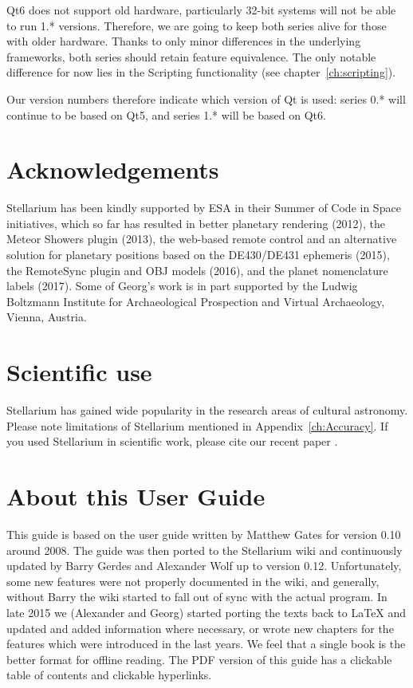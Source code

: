 Qt6 does not support old hardware, particularly 32-bit systems will
not be able to run 1.* versions.  Therefore, we are going to keep both
series alive for those with older hardware. Thanks to only minor
differences in the underlying frameworks, both series should retain
feature equivalence. The only notable difference for now lies in the
Scripting functionality (see chapter~\ref{ch:scripting}).

Our version numbers therefore indicate which version of Qt is used:
series 0.* will continue to be based on Qt5, and series 1.* will be
based on Qt6.

\section{Acknowledgements}
Stellarium has been kindly supported by ESA in their Summer of Code in
Space initiatives, which so far has resulted in better planetary rendering
(2012), the Meteor Showers plugin (2013), the web-based remote
control and an alternative solution for planetary positions based on
the DE430/DE431 ephemeris (2015), the RemoteSync plugin and OBJ models (2016), 
and the planet nomenclature labels (2017). Some of Georg's work is
in part supported by the Ludwig Boltzmann Institute for Archaeological
Prospection and Virtual Archaeology, Vienna, Austria.

\section{Scientific use}

Stellarium has gained wide popularity in the research areas of
cultural astronomy. Please note limitations of Stellarium mentioned in
Appendix~\ref{ch:Accuracy}. If you used Stellarium in scientific work,
please cite our recent paper \citep{Zotti-etal:JSA2020.6.2}.

\section{About this User Guide}
This guide is based on the user guide written by Matthew Gates for
version 0.10 around 2008. The guide was then ported to the Stellarium
wiki and continuously updated by Barry Gerdes and Alexander Wolf up to version 0.12. 
Unfortunately, some new features were not properly documented in the wiki, and generally, 
without Barry the wiki started to fall out of sync with
the actual program.  In late 2015 we (Alexander and Georg) started porting the texts
back to \LaTeX{} and updated and added information where necessary, 
or wrote new chapters for the features which were introduced in the last years. 
We feel that a single book is the better format for offline
reading. The PDF version of this guide has a clickable table of
contents and clickable hyperlinks.

